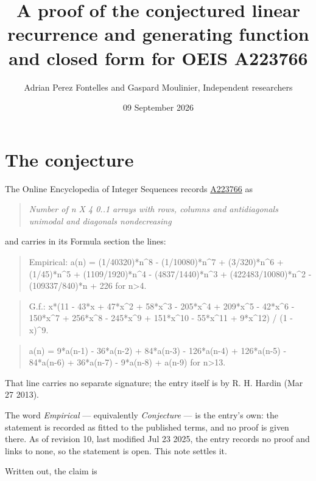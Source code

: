 \documentclass[11pt]{article}
\title{A proof of the conjectured linear recurrence and generating function and closed form for OEIS A223766}
\author{Adrian Perez Fontelles and Gaspard Moulinier, Independent researchers}
\date{09 September 2026}
\theoremstyle{definition}
\begin{document}
\maketitle
\section{The conjecture}

The Online Encyclopedia of Integer Sequences records \href{https://oeis.org/A223766}{A223766} as

\begin{quote}\itshape Number of n X 4 0..1 arrays with rows, columns and antidiagonals unimodal and diagonals nondecreasing\end{quote}

and carries in its Formula section the lines:

\begin{quote}\ttfamily Empirical: a(n) = (1/40320)*n\textasciicircum{}8 - (1/10080)*n\textasciicircum{}7 + (3/320)*n\textasciicircum{}6 + (1/45)*n\textasciicircum{}5 + (1109/1920)*n\textasciicircum{}4 - (4837/1440)*n\textasciicircum{}3 + (422483/10080)*n\textasciicircum{}2 - (109337/840)*n + 226 for n>4.\end{quote}

\begin{quote}\ttfamily G.f.: x*(11 - 43*x + 47*x\textasciicircum{}2 + 58*x\textasciicircum{}3 - 205*x\textasciicircum{}4 + 209*x\textasciicircum{}5 - 42*x\textasciicircum{}6 - 150*x\textasciicircum{}7 + 256*x\textasciicircum{}8 - 245*x\textasciicircum{}9 + 151*x\textasciicircum{}10 - 55*x\textasciicircum{}11 + 9*x\textasciicircum{}12) / (1 - x)\textasciicircum{}9.\end{quote}

\begin{quote}\ttfamily a(n) = 9*a(n-1) - 36*a(n-2) + 84*a(n-3) - 126*a(n-4) + 126*a(n-5) - 84*a(n-6) + 36*a(n-7) - 9*a(n-8) + a(n-9) for n>13.\end{quote}

That line carries no separate signature; the entry itself is by R. H. Hardin (Mar 27 2013).

The word {\itshape Empirical} --- equivalently {\itshape Conjecture} --- is the entry's own: the statement is recorded as fitted to the published terms, and no proof is given there. As of revision 10, last modified Jul 23 2025, the entry records no proof and links to none, so the statement is open. This note settles it.

Written out, the claim is
\end{document}
